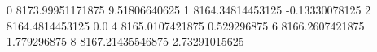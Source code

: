 0 8173.99951171875 9.51806640625
1 8164.34814453125 -0.13330078125
2 8164.4814453125 0.0
4 8165.0107421875 0.529296875
6 8166.2607421875 1.779296875
8 8167.21435546875 2.73291015625
